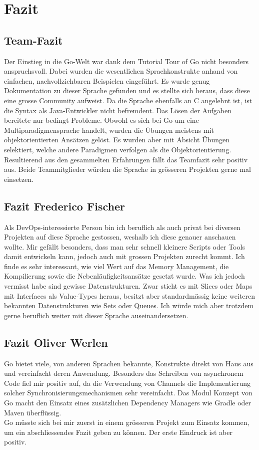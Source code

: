 \documentclass[12pt,titlepage]{article}
\begin{document}
\section{Fazit}
\subsection{Team-Fazit}
Der Einstieg in die Go-Welt war dank dem Tutorial \glqq Tour of Go\grqq{} nicht besonders anspruchsvoll.
Dabei wurden die wesentlichen Sprachkonstrukte anhand von einfachen, nachvollziehbaren Beispielen eingeführt.
Es wurde genug Dokumentation zu dieser Sprache gefunden und es stellte sich heraus, dass diese eine grosse Community aufweist.
Da die Sprache ebenfalls an C angelehnt ist, ist die Syntax als Java-Entwickler nicht befremdent.
Das Lösen der Aufgaben bereitete nur bedingt Probleme.
Obwohl es sich bei Go um eine Multiparadigmensprache handelt, wurden die Übungen meistens mit objektorientierten Ansätzen gelöst.
Es wurden aber mit Absicht Übungen selektiert, welche andere Paradigmen verfolgen als die Objektorientierung. \\
Resultierend aus den gesammelten Erfahrungen fällt das Teamfazit sehr positiv aus.
Beide Teammitglieder würden die Sprache in grösseren Projekten gerne mal einsetzen.

\subsection{Fazit Frederico Fischer}
Als DevOps-interessierte Person bin ich beruflich als auch privat bei diversen Projekten auf diese Sprache gestossen, weshalb ich diese genauer anschauen wollte.
Mir gefällt besonders, dass man sehr schnell kleinere Scripts oder Tools damit entwickeln kann, jedoch auch mit grossen Projekten zurecht kommt.
Ich finde es sehr interessant, wie viel Wert auf das Memory Management, die Kompilierung sowie die Nebenläufigkeitsansätze gesetzt wurde.
Was ich jedoch vermisst habe sind gewisse Datenstrukturen.
Zwar sticht es mit Slices oder Maps mit Interfaces als Value-Types heraus, besitzt aber standardmässig keine weiteren bekannten Datenstrukturen wie Sets oder Queues.
Ich würde mich aber trotzdem gerne beruflich weiter mit dieser Sprache auseinandersetzen.

\subsection{Fazit Oliver Werlen}
Go bietet viele, von anderen Sprachen bekannte, Konstrukte direkt von Haus aus und vereinfacht deren Anwendung.
Besonders das Schreiben von asynchronem Code fiel mir positiv auf, da die Verwendung von Channels die Implementierung solcher Synchronisierungsmechanismen sehr vereinfacht.
Das Modul Konzept von Go macht den Einsatz eines zusätzlichen Dependency Managers wie Gradle oder Maven überflüssig. \\
Go müsste sich bei mir zuerst in einem grösseren Projekt zum Einsatz kommen, um ein abschliessendes Fazit geben zu können.
Der erste Eindruck ist aber positiv.

    
\end{document}
